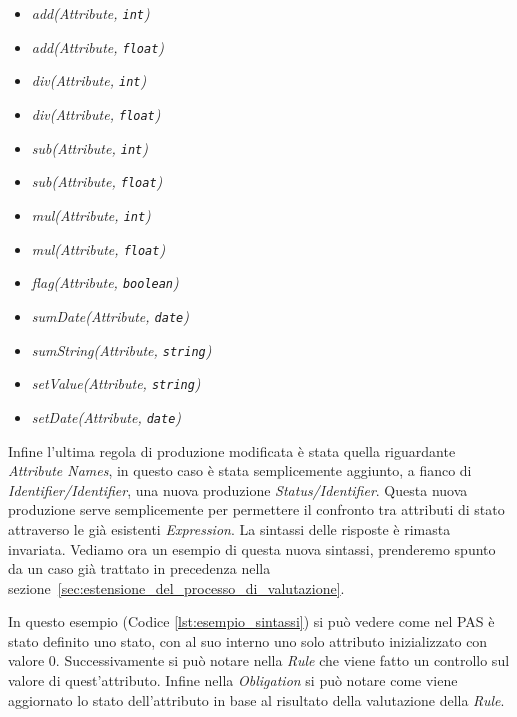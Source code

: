 \begin{itemize}
	\item \textit{add(Attribute, \texttt{int})}
	\item \textit{add(Attribute, \texttt{float})}
	\item \textit{div(Attribute, \texttt{int})}
	\item \textit{div(Attribute, \texttt{float})}
	\item \textit{sub(Attribute, \texttt{int})}
	\item \textit{sub(Attribute, \texttt{float})}
	\item \textit{mul(Attribute, \texttt{int})}
	\item \textit{mul(Attribute, \texttt{float})}
	\item \textit{flag(Attribute, \texttt{boolean})}
	\item \textit{sumDate(Attribute, \texttt{date})} 
	\item \textit{sumString(Attribute, \texttt{string})}
	\item \textit{setValue(Attribute, \texttt{string})}
	\item \textit{setDate(Attribute, \texttt{date})}
\end{itemize}
Infine l'ultima regola di produzione modificata è stata quella riguardante \textit{Attribute Names}, in questo caso è stata semplicemente aggiunto, a fianco di \textit{Identifier/Identifier}, una nuova produzione \textit{Status/Identifier}. Questa nuova produzione serve semplicemente per permettere il confronto tra attributi di stato attraverso le già esistenti \textit{Expression}.
La sintassi delle risposte è rimasta invariata.
Vediamo ora un esempio di questa nuova sintassi, prenderemo spunto da un caso già trattato in precedenza nella sezione~\ref{sec:estensione_del_processo_di_valutazione}.

In questo esempio (Codice \ref{lst:esempio_sintassi}) si può vedere come nel PAS è stato definito uno stato, con al suo interno uno solo attributo inizializzato con valore 0.
Successivamente si può notare nella \textit{Rule} che viene fatto un controllo sul valore di quest'attributo.
Infine nella \textit{Obligation} si può notare come viene aggiornato lo stato dell'attributo in base al risultato della valutazione della \textit{Rule}.

